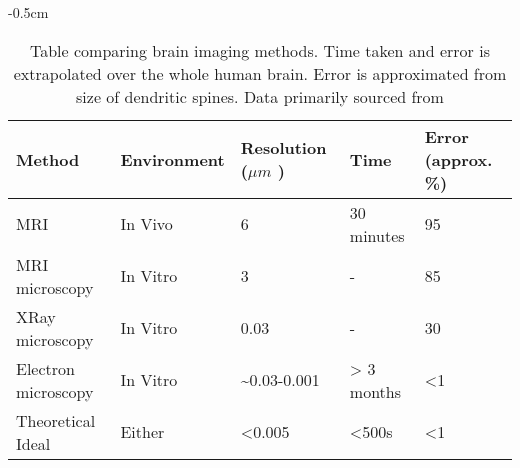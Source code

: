 \setlength{\tabcolsep}{3.3ex}
\renewcommand{\arraystretch}{1.1}
\begin{table}[h!]
    \centering
    \addtolength{\leftskip} {-0.5cm}
    \addtolength{\rightskip}{-0.5cm}
    \begin{tabular}{@{}lllll@{}}
        Method              & Environment & Resolution ($\mu m$ )                & Time       &
        Error (approx. \%)                                                                \\
        \hline
        MRI                 & In Vivo     & 6                  & 30 minutes &
        95                                                                          \\
        MRI microscopy      & In Vitro    & 3                   & -          &
        85                                                                          \\
        XRay microscopy     & In Vitro    & 0.03                       & -          &
        30                                                                          \\
        Electron microscopy & In Vitro    & \textasciitilde 0.03-0.001 & > 3 months &
        <1                                                                          \\
        Theoretical Ideal   & Either      & <0.005                       & <500s
        & <1
        \\
        \hline
    \end{tabular}
    \caption[Table comparing brain imaging methods.]{Table comparing brain
    imaging methods. Time taken and error is extrapolated over the whole human
    brain. Error is approximated from size of dendritic spines. Data primarily
    sourced from \autocite{bostrom_whole_2008, kaynig_large-scale_2015}}
    \label{imagemethodcomparison1}
\end{table}
\setlength{\tabcolsep}{1ex}